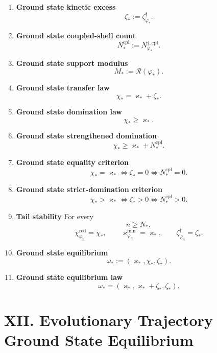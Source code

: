 \documentclass[11pt,letterpaper]{article}
\theoremstyle{plain}
\theoremstyle{definition}
\theoremstyle{remark}
\newcommand{\RestInertia}{\varkappa}
\newcommand{\TotInertia}{\chi}
\newcommand{\AccAction}{\zeta}
\newcommand{\ResEns}{\varphi}
\newcommand{\GroundEq}{{\omega_{\ast}}}
\newcommand{\GroundProj}{\mathscr{R}}
\begin{document}
\begin{enumerate}[resume]
\item \textbf{Ground state kinetic excess}
\[
\AccAction_\ast:=\AccAction_{\ResEns_\ast}^{\dagger}.
\]

\item \textbf{Ground state coupled-shell count}
\[
N_\ast^{\mathrm{cpl}}:=N_{\ResEns_\ast}^{\dagger, \mathrm{cpl}}.
\]

\item \textbf{Ground state support modulus}
\[
M_\ast:=\GroundProj(\ResEns_\ast).
\]

\item \textbf{Ground state transfer law}
\[
\TotInertia_\ast=\RestInertia_\ast+\AccAction_\ast.
\]

\item \textbf{Ground state domination law}
\[
\TotInertia_\ast\ge \RestInertia_\ast.
\]

\item \textbf{Ground state strengthened domination}
\[
\TotInertia_\ast\ge \RestInertia_\ast+N_\ast^{\mathrm{cpl}}.
\]

\item \textbf{Ground state equality criterion}
\[
\TotInertia_\ast=\RestInertia_\ast
\iff
\AccAction_\ast=0
\iff
N_\ast^{\mathrm{cpl}}=0.
\]

\item \textbf{Ground state strict-domination criterion}
\[
\TotInertia_\ast>\RestInertia_\ast
\iff
\AccAction_\ast>0
\iff
N_\ast^{\mathrm{cpl}}>0.
\]

\item \textbf{Tail stability}
For every
\[
n\ge N_\ast,
\]
\[
\TotInertia_{\ResEns_n}^{\mathrm{red}}=\TotInertia_\ast,
\qquad
\RestInertia_{\ResEns_n}^{\min}=\RestInertia_\ast,
\qquad
\AccAction_{\ResEns_n}^{\dagger}=\AccAction_\ast.
\]

\item \textbf{Ground state equilibrium}
\[
\GroundEq:=(\RestInertia_\ast,\TotInertia_\ast,\AccAction_\ast).
\]

\item \textbf{Ground state equilibrium law}
\[
\GroundEq=(\RestInertia_\ast,\RestInertia_\ast+\AccAction_\ast,\AccAction_\ast).
\]
\end{enumerate}

\section*{XII. Evolutionary Trajectory Ground State Equilibrium}
\end{document}

